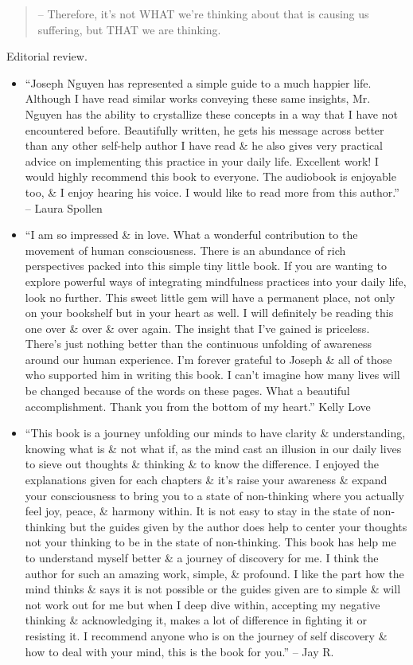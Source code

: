\documentclass{article}
\begin{document}
\begin{enumerate}
\begin{quotation}
		-- Therefore, it's not WHAT we're thinking about that is causing us suffering, but THAT we are thinking.
	\end{quotation}
	{\sf Editorial review.}
	\begin{itemize}
		\item ``{\sc Joseph Nguyen} has represented a simple guide to a much happier life. Although I have read similar works conveying these same insights, Mr. {\sc Nguyen} has the ability to crystallize these concepts in a way that I have not encountered before. Beautifully written, he gets his message across better than any other self-help author I have read \& he also gives very practical advice on implementing this practice in your daily life. Excellent work! I would highly recommend this book to everyone. The audiobook is enjoyable too, \& I enjoy hearing his voice. I would like to read more from this author.'' -- {\sc Laura Spollen}
		\item ``I am so impressed \& in love. What a wonderful contribution to the movement of human consciousness. There is an abundance of rich perspectives packed into this simple tiny little book. If you are wanting to explore powerful ways of integrating mindfulness practices into your daily life, look no further. This sweet little gem will have a permanent place, not only on your bookshelf but in your heart as well. I will definitely be reading this one over \& over \& over again. The insight that I've gained is priceless. There's just nothing better than the continuous unfolding of awareness around our human experience. I'm forever grateful to {\sc Joseph} \& all of those who supported him in writing this book. I can't imagine how many lives will be changed because of the words on these pages. What a beautiful accomplishment. Thank you from the bottom of my heart.'' {\sc Kelly Love}
		\item ``This book is a journey unfolding our minds to have clarity \& understanding, knowing what is \& not what if, as the mind cast an illusion in our daily lives to sieve out thoughts \& thinking \& to know the difference. I enjoyed the explanations given for each chapters \& it's raise your awareness \& expand your consciousness to bring you to a state of non-thinking where you actually feel joy, peace, \& harmony within. It is not easy to stay in the state of non-thinking but the guides given by the author does help to center your thoughts not your thinking to be in the state of non-thinking. This book has help me to understand myself better \& a journey of discovery for me. I think the author for such an amazing work, simple, \& profound. I like the part how the mind thinks \& says it is not possible or the guides given are to simple \& will not work out for me but when I deep dive within, accepting my negative thinking \& acknowledging it, makes a lot of difference in fighting it or resisting it. I recommend anyone who is on the journey of self discovery \& how to deal with your mind, this is the book for you.'' -- {\sc Jay R.}

\end{itemize}
\end{enumerate}
\end{document}
